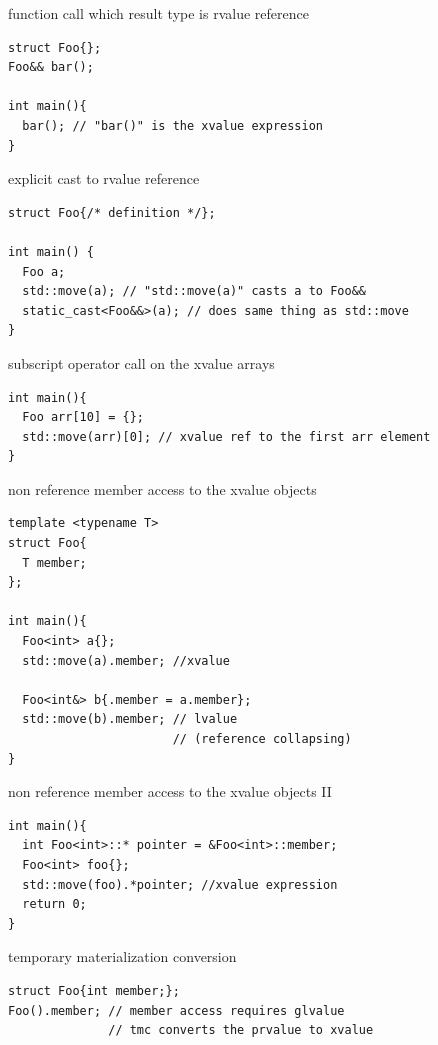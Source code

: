 \documentclass[10pt]{beamer}
\begin{document}
\begin{frame}[fragile]{function call which result type is rvalue reference}
	\begin{verbatim}
struct Foo{};
Foo&& bar(); 

int main(){
  bar(); // "bar()" is the xvalue expression 
}
	\end{verbatim}
\end{frame}

\begin{frame}[fragile]{explicit cast to rvalue reference}

\begin{verbatim}
struct Foo{/* definition */};

int main() {
  Foo a;
  std::move(a); // "std::move(a)" casts a to Foo&&
  static_cast<Foo&&>(a); // does same thing as std::move
}
\end{verbatim}

\end{frame}

\begin{frame}[fragile]{subscript operator call on the xvalue arrays}
	\begin{verbatim}
int main(){
  Foo arr[10] = {};
  std::move(arr)[0]; // xvalue ref to the first arr element
}
	\end{verbatim}
\end{frame}

\begin{frame}[fragile]{non reference member access  to the xvalue objects}
	\begin{verbatim}
template <typename T>
struct Foo{
  T member;
};

int main(){
  Foo<int> a{};
  std::move(a).member; //xvalue 
  
  Foo<int&> b{.member = a.member};
  std::move(b).member; // lvalue 
                       // (reference collapsing)
}
	\end{verbatim}
\end{frame}

\begin{frame}[fragile]{non reference member access  to the xvalue objects II}
	\begin{verbatim}
int main(){
  int Foo<int>::* pointer = &Foo<int>::member;
  Foo<int> foo{};
  std::move(foo).*pointer; //xvalue expression
  return 0;
}
	\end{verbatim}
\end{frame}

\begin{frame}[fragile]{temporary materialization conversion}
	\begin{verbatim}
struct Foo{int member;};
Foo().member; // member access requires glvalue
              // tmc converts the prvalue to xvalue
	\end{verbatim}
\end{frame}
\end{document}
